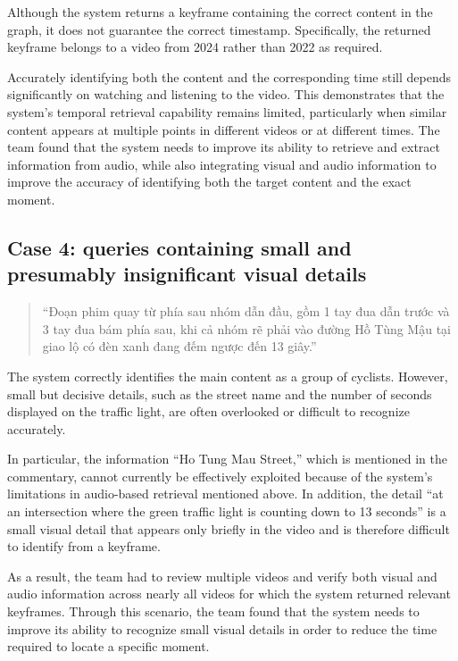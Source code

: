 \documentclass[11pt,a4paper]{article}
\begin{document}
Although the system returns a keyframe containing the correct content in the graph, it does not guarantee the correct timestamp. Specifically, the returned keyframe belongs to a video from 2024 rather than 2022 as required.

Accurately identifying both the content and the corresponding time still depends significantly on watching and listening to the video. This demonstrates that the system's temporal retrieval capability remains limited, particularly when similar content appears at multiple points in different videos or at different times. The team found that the system needs to improve its ability to retrieve and extract information from audio, while also integrating visual and audio information to improve the accuracy of identifying both the target content and the exact moment.


\subsection{Case 4: queries containing small and presumably insignificant visual details}

\begin{quote}
    ``Đoạn phim quay từ phía sau nhóm dẫn đầu, gồm 1 tay đua dẫn trước và 3 tay đua bám phía sau, khi cả nhóm rẽ phải vào đường Hồ Tùng Mậu tại giao lộ có đèn xanh đang đếm ngược đến 13 giây.''
\end{quote}

The system correctly identifies the main content as a group of cyclists. However, small but decisive details, such as the street name and the number of seconds displayed on the traffic light, are often overlooked or difficult to recognize accurately.

In particular, the information “Ho Tung Mau Street,” which is mentioned in the commentary, cannot currently be effectively exploited because of the system's limitations in audio-based retrieval mentioned above. In addition, the detail “at an intersection where the green traffic light is counting down to 13 seconds” is a small visual detail that appears only briefly in the video and is therefore difficult to identify from a keyframe.

As a result, the team had to review multiple videos and verify both visual and audio information across nearly all videos for which the system returned relevant keyframes. Through this scenario, the team found that the system needs to improve its ability to recognize small visual details in order to reduce the time required to locate a specific moment.
\end{document}
